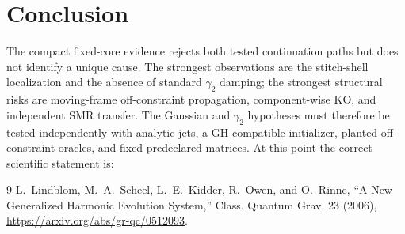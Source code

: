\documentclass[11pt]{article}
\begin{document}
\section{Conclusion}

The compact fixed-core evidence rejects both tested continuation paths but
does not identify a unique cause.  The strongest observations are the
stitch-shell localization and the absence of standard $\gamma_2$ damping;
the strongest structural risks are moving-frame off-constraint propagation,
component-wise KO, and independent SMR transfer.  The Gaussian and
$\gamma_2$ hypotheses must therefore be tested independently with analytic
jets, a GH-compatible initializer, planted off-constraint oracles, and fixed
predeclared matrices.  At this point the correct scientific statement is:
\begin{center}
\end{center}

\begin{thebibliography}{9}
L.~Lindblom, M.~A.~Scheel, L.~E.~Kidder, R.~Owen, and O.~Rinne,
``A New Generalized Harmonic Evolution System,''
Class. Quantum Grav. 23 (2006),
\url{https://arxiv.org/abs/gr-qc/0512093}.
\end{thebibliography}
\end{document}
